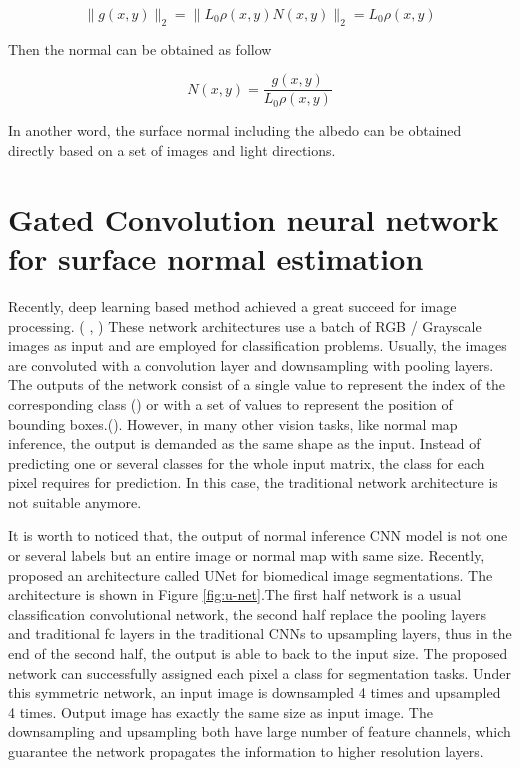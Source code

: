 \[ \|g(x,y)\|_2 = \|L_0\rho(x,y)N(x,y)\|_2 = L_0\rho(x,y) \]

Then the normal can be obtained as follow

\[  N(x,y) = \frac{g(x,y)}{L_0\rho(x,y)}\]

In another word, the surface normal including the albedo can be obtained directly based on a set of images and light directions. 


\section{Gated Convolution neural network for surface normal estimation}
\label{sec:gcnn}


Recently, deep learning based method achieved a great succeed for image processing. ( \cite{yolov3}, \cite{efficientDet}) These network architectures use a batch of RGB / Grayscale images as input and are employed for classification problems. Usually, the images are convoluted with a convolution layer and downsampling with pooling layers. The outputs of the network consist of a single value to represent the index of the corresponding class (\cite{efficientDet}) or with a set of values to represent the position of bounding boxes.(\cite{yolov3}). However, in many other vision tasks, like normal map inference, the output is demanded as the same shape as the input. Instead of predicting one or several classes for the whole input matrix, the class for each pixel requires for prediction. In this case, the traditional network architecture is not suitable anymore.

It is worth to noticed that, the output of normal inference CNN model is not one or several labels but an entire image or normal map with same size. 
Recently,\cite{unet} proposed an architecture called UNet for biomedical image segmentations. The architecture is shown in Figure \ref{fig:u-net}.The first half network is a usual classification convolutional network, the second half replace the pooling layers and traditional fc layers in the traditional CNNs to upsampling layers, thus in the end of the second half, the output is able to back to the input size. The proposed network can successfully assigned each pixel a class for segmentation tasks. Under this symmetric network, an input image is downsampled 4 times and upsampled 4 times. Output image has exactly the same size as input image. The downsampling and upsampling both have large number of feature channels, which guarantee the network propagates the information to higher resolution layers.

